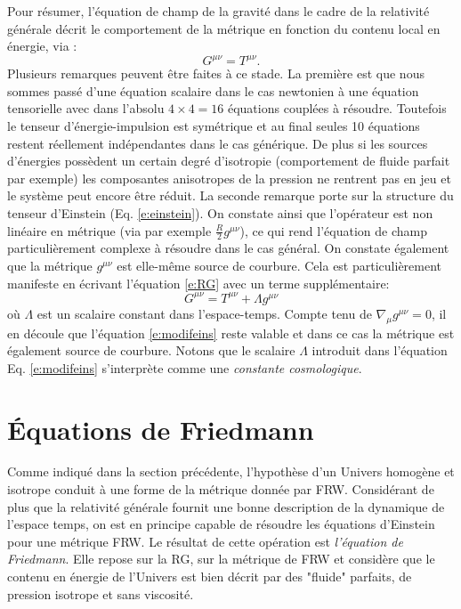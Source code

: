 Pour résumer, l'équation de champ de la gravité dans le cadre de la relativité générale décrit le comportement de la métrique en fonction du contenu local en énergie, via :
\begin{equation}
G^{\mu\nu}=T^{\mu\nu}.
\label{e:RG}
\end{equation}
Plusieurs remarques peuvent être faites à ce stade. La première est que nous sommes passé d'une équation scalaire dans le cas newtonien à une équation tensorielle avec dans l'absolu $ 4\times 4=16$ équations couplées à résoudre. Toutefois le tenseur d'énergie-impulsion est symétrique et au final seules 10 équations restent réellement indépendantes dans le cas générique. De plus si les sources d'énergies possèdent un certain degré d'isotropie (comportement de fluide parfait par exemple) les composantes anisotropes de la pression ne rentrent pas en jeu et le système peut encore être réduit. La seconde remarque porte sur la structure du tenseur d'Einstein (Eq. \ref{e:einstein}). On constate ainsi que l'opérateur est non linéaire  en métrique (via par exemple $\frac{R}{2}g^{\mu\nu}$), ce qui rend l'équation de champ particulièrement complexe à résoudre dans le cas général. On constate également que la métrique $g^{\mu\nu}$ est elle-même source de courbure. Cela est particulièrement manifeste en écrivant l'équation \ref{e:RG} avec un terme supplémentaire:
\begin{equation}
G^{\mu\nu}=T^{\mu\nu}+\Lambda g^{\mu\nu}
\label{e:modifeins}
\end{equation}
où $\Lambda$ est un scalaire constant dans l'espace-temps. Compte tenu de $\nabla_\mu g^{\mu \nu}=0$, il en découle que l'équation \ref{e:modifeins} reste valable et dans ce cas  la métrique est également source de courbure. Notons que le scalaire $\Lambda$ introduit dans l'équation Eq. \ref{e:modifeins} s'interprète comme une \textit{constante cosmologique}.

\section{Équations de Friedmann}
Comme indiqué dans la section précédente, l'hypothèse d'un Univers homogène et isotrope conduit à une forme de la métrique donnée par FRW. Considérant de plus que la relativité générale fournit une bonne description de la dynamique de l'espace temps, on est en principe capable de résoudre les équations d'Einstein pour une métrique FRW. Le résultat de cette opération est \textit{l'équation de Friedmann}. Elle repose sur la RG, sur la métrique de FRW et considère que le contenu en énergie de l'Univers est bien décrit par des "fluide" parfaits, de pression isotrope et sans viscosité.


